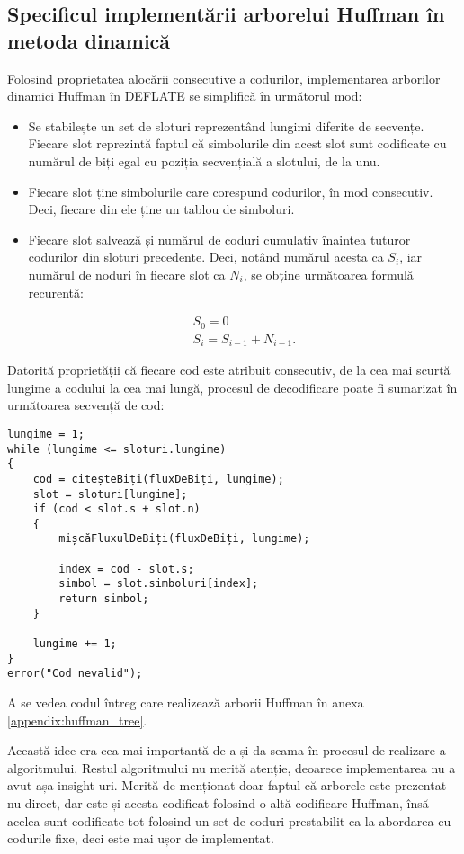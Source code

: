 \documentclass[a4paper,12pt]{report}
\begin{document}
\subsection{Specificul implementării arborelui Huffman în metoda dinamică}

Folosind proprietatea alocării consecutive a codurilor,
implementarea arborilor dinamici Huffman în DEFLATE se simplifică în următorul mod:
\begin{itemize}
    \item 
        Se stabilește un set de sloturi reprezentând lungimi diferite de secvențe.
        Fiecare slot reprezintă faptul că simbolurile din acest slot
        sunt codificate cu numărul de biți egal cu poziția secvențială a slotului, de la unu.
    \item
        Fiecare slot ține simbolurile care corespund codurilor, în mod consecutiv.
        Deci, fiecare din ele ține un tablou de simboluri.
    \item
        Fiecare slot salvează și numărul de coduri cumulativ înaintea tuturor codurilor din sloturi precedente.
        Deci, notând numărul acesta ca \( S_i \), iar numărul de noduri în fiecare slot ca \( N_i \),
        se obține următoarea formulă recurentă:

        \begin{gather*}
            S_0 = 0 \\
            S_i = S_{i - 1} + N_{i - 1}.
        \end{gather*}
\end{itemize}

Datorită proprietății că fiecare cod este atribuit consecutiv,
de la cea mai scurtă lungime a codului la cea mai lungă,
procesul de decodificare poate fi sumarizat în următoarea secvență de cod:

\begin{verbatim}
lungime = 1;
while (lungime <= sloturi.lungime)
{
    cod = citeșteBiți(fluxDeBiți, lungime);
    slot = sloturi[lungime];
    if (cod < slot.s + slot.n)
    {
        mișcăFluxulDeBiți(fluxDeBiți, lungime);

        index = cod - slot.s;
        simbol = slot.simboluri[index];
        return simbol;
    }

    lungime += 1;
}
error("Cod nevalid");
\end{verbatim}

A se vedea codul întreg care realizează arborii Huffman în anexa \ref{appendix:huffman_tree}.

Această idee era cea mai importantă de a-și da seama în procesul de realizare a algoritmului.
Restul algoritmului nu merită atenție, deoarece implementarea nu a avut așa insight-uri.
Merită de menționat doar faptul că arborele este prezentat nu direct,
dar este și acesta codificat folosind o altă codificare Huffman,
însă acelea sunt codificate tot folosind un set de coduri prestabilit
ca la abordarea cu codurile fixe, deci este mai ușor de implementat.
\end{document}
